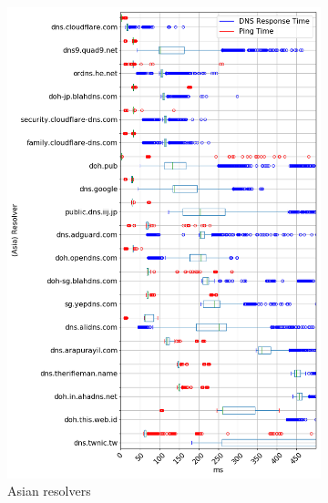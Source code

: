 \begin{figure}[t!]
\begin{subfigure}[t]{0.5\textwidth}
        \includegraphics[width=\linewidth]{figures/Seoul_Asia.png}
        \caption{Asian resolvers}
    \end{subfigure}
    ~ 
    \begin{subfigure}[t]{0.5\textwidth}
        \centering

\end{subfigure}
\end{figure}
